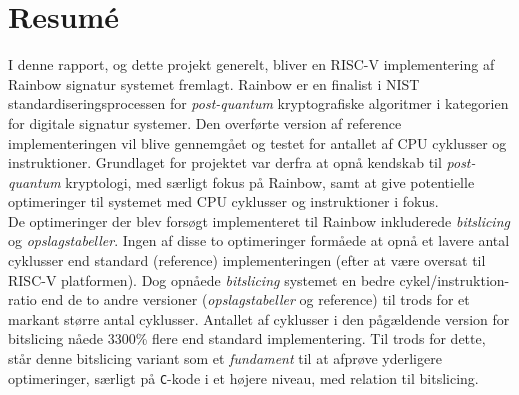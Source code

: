 \section*{Resumé}
I denne rapport, og dette projekt generelt, bliver en RISC-V implementering af Rainbow signatur systemet fremlagt. Rainbow er en finalist i NIST standardiseringsprocessen for \emph{post-quantum} kryptografiske algoritmer i kategorien for digitale signatur systemer. Den overførte version af reference implementeringen vil blive gennemgået og testet for antallet af CPU cyklusser og instruktioner. Grundlaget for projektet var derfra at opnå kendskab til \emph{post-quantum} kryptologi, med særligt fokus på Rainbow, samt at give potentielle optimeringer til systemet med CPU cyklusser og instruktioner i fokus.
\medskip\\
De optimeringer der blev forsøgt implementeret til Rainbow inkluderede \emph{bitslicing} og \emph{opslagstabeller}. Ingen af disse to optimeringer formåede at opnå et lavere antal cyklusser end standard (reference) implementeringen (efter at være oversat til RISC-V platformen). Dog opnåede \emph{bitslicing} systemet en bedre cykel/instruktion-ratio end de to andre versioner (\emph{opslagstabeller} og reference) til trods for et markant større antal cyklusser. Antallet af cyklusser i den pågældende version for bitslicing nåede 3300\% flere end standard implementering. Til trods for dette, står denne bitslicing variant som et \emph{fundament} til at afprøve yderligere optimeringer, særligt på \texttt{C}-kode i et højere niveau, med relation til bitslicing.

\pagebreak